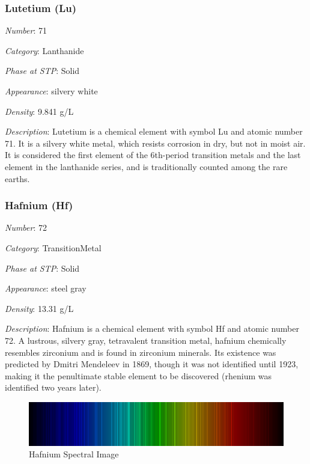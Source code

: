 \documentclass{article}
\begin{document}
\hypertarget{subsubsection::Lu}{}\subsubsection{Lutetium (Lu)}

\textit{Number}: 71

\textit{Category}: Lanthanide

\textit{Phase at STP}: Solid

\textit{Appearance}: silvery white

\textit{Density}: 9.841 g/L

\textit{Description}: Lutetium is a chemical element with symbol Lu and atomic number 71. It is a silvery white metal, which resists corrosion in dry, but not in moist air. It is considered the first element of the 6th-period transition metals and the last element in the lanthanide series, and is traditionally counted among the rare earths.

\hypertarget{subsubsection::Hf}{}\subsubsection{Hafnium (Hf)}

\textit{Number}: 72

\textit{Category}: TransitionMetal

\textit{Phase at STP}: Solid

\textit{Appearance}: steel gray

\textit{Density}: 13.31 g/L

\textit{Description}: Hafnium is a chemical element with symbol Hf and atomic number 72. A lustrous, silvery gray, tetravalent transition metal, hafnium chemically resembles zirconium and is found in zirconium minerals. Its existence was predicted by Dmitri Mendeleev in 1869, though it was not identified until 1923, making it the penultimate stable element to be discovered (rhenium was identified two years later).

\immediate{}
\begin{figure}[!ht]
    \centering
    \includegraphics[width=12cm]{./resources/spectral_img/Hafnium_spectrum_visible.png}
    \caption{Hafnium Spectral Image}
\end{figure}
\end{document}
